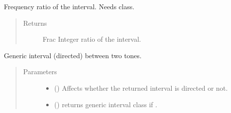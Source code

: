 \documentclass[letterpaper,10pt,english]{sphinxmanual}
\begin{document}
\begin{fulllineitems}
\begin{fulllineitems}
\end{fulllineitems}


\begin{fulllineitems}
\label{\detokenize{api:musictheory.Interval.get_frequency_ratio}}
Frequency ratio of the interval.
Needs  class.
\begin{quote}\begin{description}
\item[{Returns}] \leavevmode
Frac \textendash{} Integer ratio of the interval.

\end{description}\end{quote}

\end{fulllineitems}


\begin{fulllineitems}
\label{\detokenize{api:musictheory.Interval.get_generic_interval}}
Generic interval (directed) between two tones.
\begin{quote}\begin{description}
\item[{Parameters}] \leavevmode\begin{itemize}
\item {} 
 () \textendash{} Affects whether the returned interval is directed or not.

\item {} 
 () \textendash{} returns generic interval class if .


\end{itemize}
\end{description}
\end{quote}
\end{fulllineitems}
\end{fulllineitems}
\end{document}

